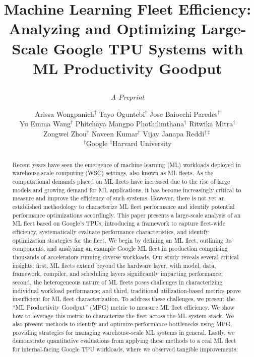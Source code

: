 \documentclass[sigconf]{acmart}
\begin{document}
\title{Machine Learning Fleet Efficiency: Analyzing and Optimizing Large-Scale Google TPU Systems with ML Productivity Goodput\\[.25em] \subtitle{\emph{A Preprint}}}

\author{\Large
    Arissa Wongpanich$^{\dagger}$
    Tayo Oguntebi$^{\dagger}$
    Jose Baiocchi Paredes$^{\dagger}$\\
    Yu Emma Wang$^{\dagger}$
    Phitchaya Mangpo Phothilimthana$^{\dagger}$
    Ritwika Mitra$^{\dagger}$\\
    Zongwei Zhou$^{\dagger}$
    Naveen Kumar$^{\dagger}$
    Vijay Janapa Reddi$^{\dagger\ddagger}$ \\[1em]
    $^{\dagger}$Google \hspace{1cm} $^{\ddagger}$Harvard University\\[1em]
}

  \renewcommand{\shortauthors}{}



\begin{abstract}
Recent years have seen the emergence of machine learning (ML) workloads deployed in warehouse-scale computing (WSC) settings, also known as ML fleets. As the computational demands placed on ML fleets have increased due to the rise of large models and growing demand for ML applications, it has become increasingly critical to measure and improve the efficiency of such systems. However, there is not yet an established methodology to characterize ML fleet performance and identify potential performance optimizations accordingly. This paper presents a large-scale analysis of an ML fleet based on Google's TPUs, introducing a framework to capture fleet-wide efficiency, systematically evaluate performance characteristics, and identify optimization strategies for the fleet. We begin by defining an ML fleet, outlining its components, and analyzing an example Google ML fleet in production comprising thousands of accelerators running diverse workloads. Our study reveals several critical insights: first, ML fleets extend beyond the hardware layer, with model, data, framework, compiler, and scheduling layers significantly impacting performance; second, the heterogeneous nature of ML fleets poses challenges in characterizing individual workload performance; and third, traditional utilization-based metrics prove insufficient for ML fleet characterization. To address these challenges, we present the ``ML Productivity Goodput'' (MPG) metric to measure ML fleet efficiency. We show how to leverage this metric to characterize the fleet across the ML system stack. We also present methods to identify and optimize performance bottlenecks using MPG, providing strategies for managing warehouse-scale ML systems in general. Lastly, we demonstrate quantitative evaluations from applying these methods to a real ML fleet for internal-facing Google TPU workloads, where we observed tangible improvements.

\end{abstract}
\end{document}
